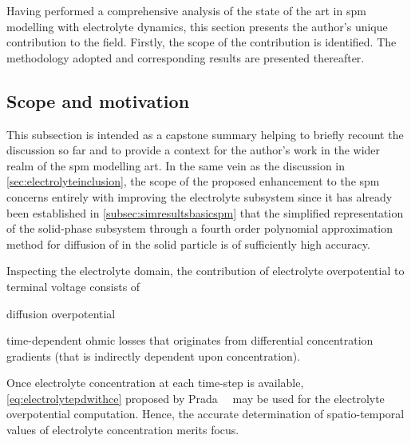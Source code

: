 
Having performed a  comprehensive analysis of the state of  the art in \gls{spm}
modelling with electrolyte  dynamics, this section presents  the author's unique
contribution to the field. Firstly, the scope of the contribution is identified.
The methodology adopted and corresponding results are presented thereafter.

\subsection{Scope and motivation}\label{subsec:scopenewelectrolyte}

This subsection is intended as a capstone summary helping to briefly recount the
discussion so far  and to provide a  context for the author's work  in the wider
realm  of the  \gls{spm}  modelling art.  In  the same  vein  as the  discussion
in \cref{sec:electrolyteinclusion}, the scope of the proposed enhancement to the
\gls{spm}  concerns  entirely with  improving  the  electrolyte subsystem  since
it  has already  been established  in \cref{subsec:simresultsbasicspm} that  the
simplified representation  of the solid-phase  subsystem through a  fourth order
polynomial approximation method for diffusion of  in the solid particle
is of sufficiently high accuracy.

Inspecting the electrolyte domain, the contribution of electrolyte overpotential
to  terminal  voltage   consists  of
\begin{enumerate*}[label=\emph{\alph*})]
    \item diffusion   overpotential
    \item time-dependent   ohmic  losses   that  originates   from  differential concentration  gradients  (that  is   indirectly  dependent  upon
concentration).
\end{enumerate*}
Once       electrolyte        concentration       at        each       time-step
is         available, \cref{eq:electrolytepdwithce}          proposed         by
Prada~\etal~\cite{Prada2012}  may  be  used for  the  electrolyte  overpotential
computation.  Hence, the  accurate  determination of  spatio-temporal values  of
electrolyte concentration merits focus.

